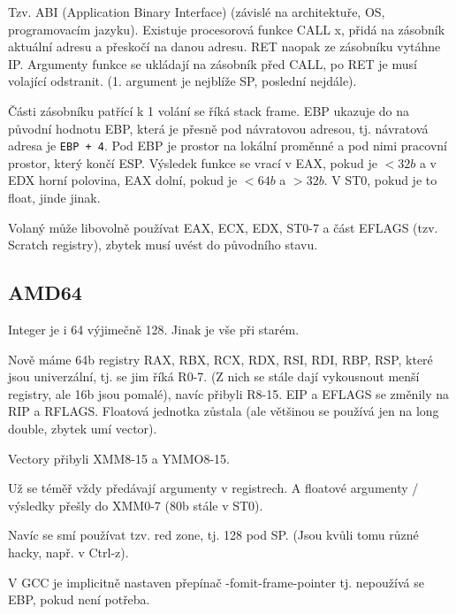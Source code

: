 \documentclass[12pt]{article}                   %
\begin{document}
        \begin{definice}
            Tzv. ABI (Application Binary Interface) (závislé na architektuře, OS, programovacím jazyku). Existuje procesorová funkce CALL x, přidá na zásobník aktuální adresu a přeskočí na danou adresu. RET naopak ze zásobníku vytáhne IP. Argumenty funkce se ukládají na zásobník před CALL, po RET je musí volající odstranit. (1. argument je nejblíže SP, poslední nejdále).

            Části zásobníku patřící k 1 volání se říká stack frame. EBP ukazuje do na původní hodnotu EBP, která je přesně pod návratovou adresou, tj. návratová adresa je \verb|EBP + 4|. Pod EBP je prostor na lokální proměnné a pod nimi pracovní prostor, který končí ESP. Výsledek funkce se vrací v EAX, pokud je $<32b$ a v EDX horní polovina, EAX dolní, pokud je $<64b$ a $>32b$. V ST0, pokud je to float, jinde jinak.

            Volaný může libovolně používat EAX, ECX, EDX, ST0-7 a část EFLAGS (tzv. Scratch registry), zbytek musí uvést do původního stavu.
        \end{definice}

    \subsection{AMD64}
        \begin{definice}
            Integer je i 64 výjimečně 128. Jinak je vše při starém.
        \end{definice}

        \begin{definice}[Registry]
            Nově máme 64b registry RAX, RBX, RCX, RDX, RSI, RDI, RBP, RSP, které jsou univerzální, tj. se jim říká R0-7. (Z nich se stále dají vykousnout menší registry, ale 16b jsou pomalé), navíc přibyli R8-15. EIP a EFLAGS se změnily na RIP a RFLAGS. Floatová jednotka zůstala (ale většinou se používá jen na long double, zbytek umí vector).

            Vectory přibyli XMM8-15 a YMMO8-15.
        \end{definice}

        \begin{definice}[ABI]
            Už se téměř vždy předávají argumenty v registrech. A floatové argumenty / výsledky přešly do XMM0-7 (80b stále v ST0).

            Navíc se smí používat tzv. red zone, tj. 128 pod SP. (Jsou kvůli tomu různé hacky, např. v Ctrl-z).

            V GCC je implicitně nastaven přepínač -fomit-frame-pointer tj. nepoužívá se EBP, pokud není potřeba.
        \end{definice}
\end{document}
